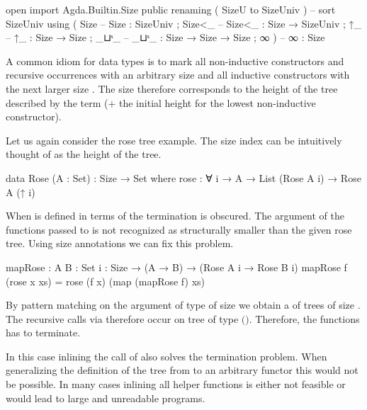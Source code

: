 \begin{code}[hide]
open import Agda.Builtin.Size public
  renaming ( SizeU to SizeUniv )  --  sort SizeUniv
  using    ( Size                 --  Size   : SizeUniv
           ; Size<_               --  Size<_ : Size → SizeUniv
           ; ↑_                   --  ↑_     : Size → Size
           ; _⊔ˢ_                 --  _⊔ˢ_   : Size → Size → Size
           ; ∞ )                  --  ∞      : Size
\end{code}

A common idiom for data types is to mark all non-inductive constructors and
recursive occurrences with an arbitrary size  and all inductive
constructors with the next larger size
\AgdaSpace{}.
The size therefore corresponds to the height of the tree described by the term
($+$ the initial height for the lowest non-inductive constructor).

Let us again consider the rose tree example.
The size index can be intuitively thought of as the height of the tree.

\begin{code}
data Rose (A : Set) : Size → Set where
  rose : ∀ {i} → A → List (Rose A i) → Rose A (↑ i)
\end{code}
When  is defined in terms of
 the termination is obscured.
The argument of the functions passed to  is not recognized as
structurally smaller than the given rose tree.
Using size annotations we can fix this problem.

\begin{code}
mapRose : {A B : Set} {i : Size} → (A → B) → (Rose A i → Rose B i)
mapRose f (rose x xs) = rose (f x) (map (mapRose f) xs)
\end{code}
By pattern matching on the argument of type
\AgdaSpace{} of size
\AgdaSpace{} we obtain a  of
trees of size .
The recursive calls via  therefore occur on tree of type 
\AgdaSpace{}$($\AgdaSpace{}$)$.
Therefore, the functions has to terminate.

In this case inlining the call of  also solves the termination
problem.
When generalizing the definition of the tree from  to an
arbitrary functor this would not be possible.
In many cases inlining all helper functions is either not feasible or would lead
to large and unreadable programs.


